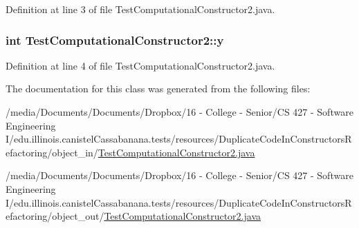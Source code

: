Definition at line 3 of file TestComputationalConstructor2.java.

\hypertarget{classTestComputationalConstructor2_a469df9698753af791f46ca0384d2a3dd}{
\subsubsection[{y}]{\setlength{\rightskip}{0pt plus 5cm}int {\bf TestComputationalConstructor2::y}}}
\label{classTestComputationalConstructor2_a469df9698753af791f46ca0384d2a3dd}


Definition at line 4 of file TestComputationalConstructor2.java.



The documentation for this class was generated from the following files:\begin{DoxyCompactItemize}
\item 
/media/Documents/Documents/Dropbox/16 -\/ College -\/ Senior/CS 427 -\/ Software Engineering I/edu.illinois.canistelCassabanana.tests/resources/DuplicateCodeInConstructorsRefactoring/object\_\-in/\hyperlink{object__in_2TestComputationalConstructor2_8java}{TestComputationalConstructor2.java}\item 
/media/Documents/Documents/Dropbox/16 -\/ College -\/ Senior/CS 427 -\/ Software Engineering I/edu.illinois.canistelCassabanana.tests/resources/DuplicateCodeInConstructorsRefactoring/object\_\-out/\hyperlink{object__out_2TestComputationalConstructor2_8java}{TestComputationalConstructor2.java}\end{DoxyCompactItemize}
